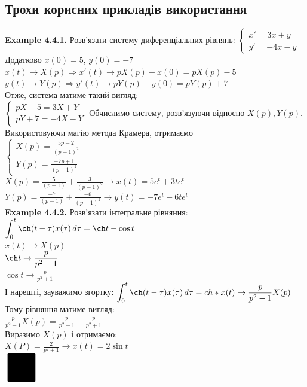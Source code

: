 \documentclass[a4paper, 10pt]{article}
\def\hugespace{\vspace{5mm} \\}
\theoremstyle{theoremdd}
\theoremstyle{theoremdd}
\theoremstyle{theoremdd}
\theoremstyle{theoremdd}
\theoremstyle{theoremdd}
\theoremstyle{theoremdd}
\theoremstyle{theoremdd}
\theoremstyle{theoremdd}
\begin{document}
\subsection{Трохи корисних прикладів використання}
\textbf{Example 4.4.1.} Розв'язати систему диференціальних рівнянь:
$\begin{cases}
x' = 3x + y \\
y' = -4x - y
\end{cases}
$\\
Додатково $x(0) = 5$, $y(0) = -7$\\
$x(t) \rightarrow X(p) \Rightarrow x'(t) \rightarrow pX(p) - x(0) = pX(p) - 5$\\
$y(t) \rightarrow Y(p) \Rightarrow y'(t) \rightarrow pY(p) - y(0) = pY(p) + 7$\\
Отже, система матиме такий вигляд:\\
$\begin{cases}
pX - 5 = 3X + Y\\
pY + 7 = -4X - Y
\end{cases}
$
Обчислимо систему, розв'язуючи відносно $X(p), Y(p)$. Використовуючи магію метода Крамера, отримаємо\\
$\begin{cases}
\displaystyle X(p) = \frac{5p-2}{(p-1)^2}\\
\displaystyle Y(p) = \frac{-7p+1}{(p-1)^2}
\end{cases}
$\\
$\displaystyle X(p) = \frac{5}{(p-1)} + \frac{3}{(p-1)^2} \rightarrow x(t) = 5e^t + 3t e^t$\\
$\displaystyle Y(p) = \frac{-7}{(p-1)} + \frac{-6}{(p-1)^2} \rightarrow y(t) = -7e^t - 6t e^t$
\hugespace
\textbf{Example 4.4.2.} Розв'язати інтегральне рівняння:\\
$\displaystyle \int_0^t \ch (t- \tau) x(\tau) \,d\tau = \ch t - \cos t$\\
$x(t) \rightarrow X(p)$\\
$\ch t \rightarrow \displaystyle \frac{p}{p^2-1}$\\
$\cos t \rightarrow \displaystyle \frac{p}{p^2+1}$\\
І нарешті, зауважимо згортку: $\displaystyle \int_0^t \ch(t-\tau) x(\tau)\,d\tau = ch * x(t) \rightarrow \frac{p}{p^2-1} X(p)$
Тому рівняння матиме вигляд:\\
$\displaystyle \frac{p}{p^2-1} X(p) = \frac{p}{p^2-1} - \frac{p}{p^2+1}$\\
Виразимо $X(p)$ і отримаємо:\\
$\displaystyle X(P) = \frac{2}{p^2+1} \rightarrow x(t) = 2 \sin t$
\hugespace
$\scaleobj{5}{\blacksquare}$
\end{document}
